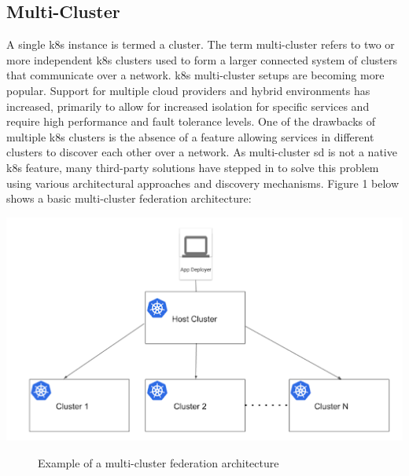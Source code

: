 \documentclass[12pt, a4paper, oneside]{article}
\begin{document}
\subsection{Multi-Cluster}
A single \acrshort{k8s} instance is termed a cluster. The term multi-cluster refers to two or more independent \acrshort{k8s} clusters used to form a larger connected system of clusters that communicate over a network. \acrshort{k8s} multi-cluster setups are becoming more popular. Support for multiple cloud providers and hybrid environments has increased, primarily to allow for increased isolation for specific services and require high performance and fault tolerance levels. One of the drawbacks of multiple \acrshort{k8s} clusters is the absence of a feature allowing services in different clusters to discover each other over a network. As multi-cluster \acrshort{sd} is not a native \acrshort{k8s} feature, many third-party solutions have stepped in to solve this problem using various architectural approaches and discovery mechanisms. Figure 1 below shows a basic multi-cluster federation architecture:
\begin{center}
	\includegraphics[scale=0.7]{images/cluster-federation.png}
	\begin{figure}[hp]
		\caption[Example of a multi-cluster federation architecture]{Example of a multi-cluster federation architecture \citep{multicluster}}
	\end{figure}
\end{center}
\end{document}

